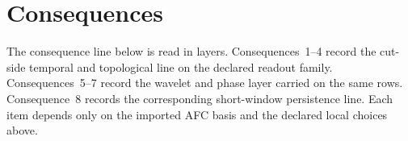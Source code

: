 \section{Consequences}
The consequence line below is read in layers. Consequences~1--4 record the cut-side temporal and topological line on the declared readout family. Consequences~5--7 record the wavelet and phase layer carried on the same rows. Consequence~8 records the corresponding short-window persistence line. Each item depends only on the imported AFC basis and the declared local choices above.








